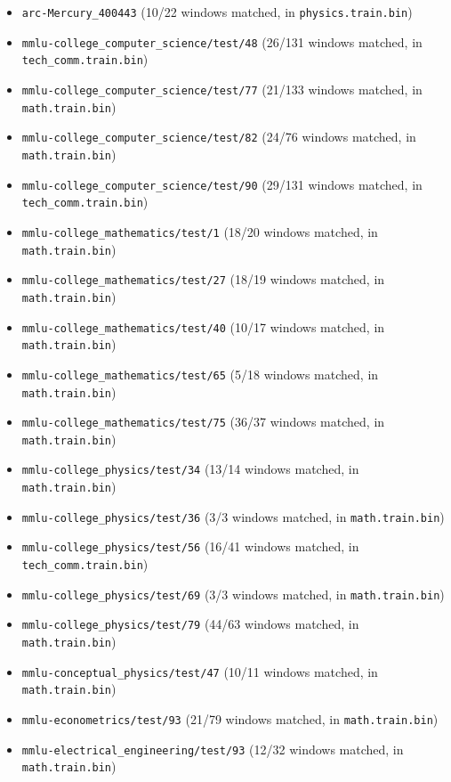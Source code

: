 \begin{itemize}\raggedright
\item \texttt{arc-Mercury\_400443} (10/22 windows matched, in \texttt{physics.train.bin})
\item \texttt{mmlu-college\_computer\_science/test/48} (26/131 windows matched, in \texttt{tech\_comm.train.bin})
\item \texttt{mmlu-college\_computer\_science/test/77} (21/133 windows matched, in \texttt{math.train.bin})
\item \texttt{mmlu-college\_computer\_science/test/82} (24/76 windows matched, in \texttt{math.train.bin})
\item \texttt{mmlu-college\_computer\_science/test/90} (29/131 windows matched, in \texttt{tech\_comm.train.bin})
\item \texttt{mmlu-college\_mathematics/test/1} (18/20 windows matched, in \texttt{math.train.bin})
\item \texttt{mmlu-college\_mathematics/test/27} (18/19 windows matched, in \texttt{math.train.bin})
\item \texttt{mmlu-college\_mathematics/test/40} (10/17 windows matched, in \texttt{math.train.bin})
\item \texttt{mmlu-college\_mathematics/test/65} (5/18 windows matched, in \texttt{math.train.bin})
\item \texttt{mmlu-college\_mathematics/test/75} (36/37 windows matched, in \texttt{math.train.bin})
\item \texttt{mmlu-college\_physics/test/34} (13/14 windows matched, in \texttt{math.train.bin})
\item \texttt{mmlu-college\_physics/test/36} (3/3 windows matched, in \texttt{math.train.bin})
\item \texttt{mmlu-college\_physics/test/56} (16/41 windows matched, in \texttt{tech\_comm.train.bin})
\item \texttt{mmlu-college\_physics/test/69} (3/3 windows matched, in \texttt{math.train.bin})
\item \texttt{mmlu-college\_physics/test/79} (44/63 windows matched, in \texttt{math.train.bin})
\item \texttt{mmlu-conceptual\_physics/test/47} (10/11 windows matched, in \texttt{math.train.bin})
\item \texttt{mmlu-econometrics/test/93} (21/79 windows matched, in \texttt{math.train.bin})
\item \texttt{mmlu-electrical\_engineering/test/93} (12/32 windows matched, in \texttt{math.train.bin})

\end{itemize}
